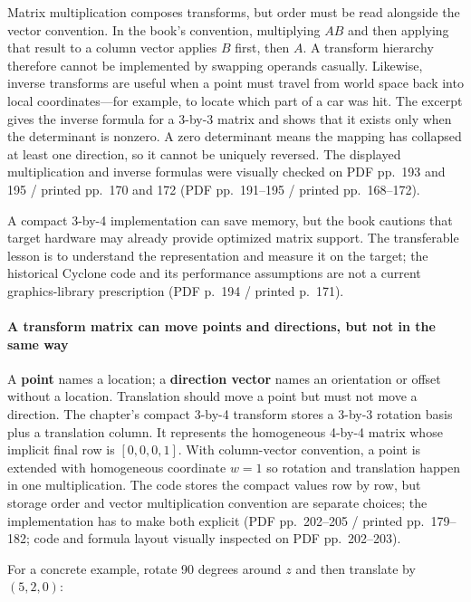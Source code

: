 Matrix multiplication composes transforms, but order must be read alongside the vector convention. In the book's convention, multiplying \(A B\) and then applying that result to a column vector applies \(B\) first, then \(A\). A transform hierarchy therefore cannot be implemented by swapping operands casually. Likewise, inverse transforms are useful when a point must travel from world space back into local coordinates---for example, to locate which part of a car was hit. The excerpt gives the inverse formula for a 3-by-3 matrix and shows that it exists only when the determinant is nonzero. A zero determinant means the mapping has collapsed at least one direction, so it cannot be uniquely reversed. The displayed multiplication and inverse formulas were visually checked on PDF pp.~193 and 195 / printed pp.~170 and 172 (PDF pp.~191--195 / printed pp.~168--172).

A compact 3-by-4 implementation can save memory, but the book cautions that target hardware may already provide optimized matrix support. The transferable lesson is to understand the representation and measure it on the target; the historical Cyclone code and its performance assumptions are not a current graphics-library prescription (PDF p.~194 / printed p.~171).

\paragraph{A transform matrix can move points and directions, but not in the same way}\label{06-engine-ii-ch025-a-transform-matrix-can-move-points-and-directions-but-not-in-the-same-way}

A \textbf{point} names a location; a \textbf{direction vector} names an orientation or offset without a location. Translation should move a point but must not move a direction. The chapter's compact 3-by-4 transform stores a 3-by-3 rotation basis plus a translation column. It represents the homogeneous 4-by-4 matrix whose implicit final row is \([0,0,0,1]\). With column-vector convention, a point is extended with homogeneous coordinate \(w=1\) so rotation and translation happen in one multiplication. The code stores the compact values row by row, but storage order and vector multiplication convention are separate choices; the implementation has to make both explicit (PDF pp.~202--205 / printed pp.~179--182; code and formula layout visually inspected on PDF pp.~202--203).

For a concrete example, rotate 90 degrees around \(z\) and then translate by \((5,2,0)\):

